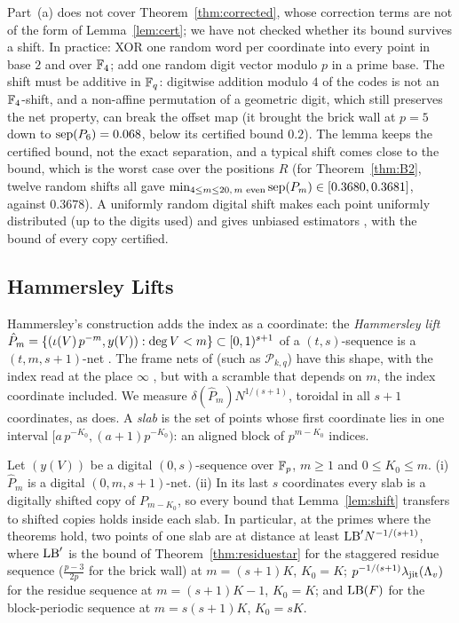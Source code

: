 Part~(a) does not cover Theorem~\ref{thm:corrected}, whose correction terms are not of the form of Lemma~\ref{lem:cert}; we have not checked whether its bound survives a shift. In practice: XOR one random word per coordinate into every point in base $2$ and over $\mathbb{F}_4$; add one random digit vector modulo $p$ in a prime base. The shift must be additive in $\mathbb{F}_q$: digitwise addition modulo $4$ of the codes is not an $\mathbb{F}_4$-shift, and a non-affine permutation of a geometric digit, which still preserves the net property, can break the offset map (it brought the brick wall at $p=5$ down to $\operatorname{sep}(P_6)=0.068$, below its certified bound $0.2$). The lemma keeps the certified bound, not the exact separation, and a typical shift comes close to the bound, which is the worst case over the positions $R$ (for Theorem~\ref{thm:B2}, twelve random shifts all gave $\min_{4\le m\le20,\,m\text{ even}}\operatorname{sep}(P_m)\in[0.3680,0.3681]$, against $0.3678$). A uniformly random digital shift makes each point uniformly distributed (up to the digits used) and gives unbiased estimators \cite{DP10}, with the bound of every copy certified.

%
%
%
%
%
%
%
%
%
%
%
\subsection{Hammersley Lifts}\label{sec:hammersley}
Hammersley's construction adds the index as a coordinate: the \emph{Hammersley lift} $\hat P_m=\{(\iota(V)\,p^{-m},y(V)):\deg V<m\}\subset[0,1)^{s+1}$ of a $(t,s)$-sequence is a $(t,m,s+1)$-net \cite[Lemma~4.22]{Nie92}. The frame nets of \cite{Gru26geo} (such as $\mathcal P_{k,q}$) have this shape, with the index read at the place $\infty$%
, but with a scramble that depends on $m$, the index coordinate included. We measure $\delta(\hat P_m)N^{1/(s+1)}$, toroidal in all $s+1$ coordinates, as \cite{Gru26geo} does. A \emph{slab} is the set of points whose first coordinate lies in one interval $[a\,p^{-K_0},(a+1)p^{-K_0})$: an aligned block of $p^{m-K_0}$ indices.

\begin{proposition}\label{prop:liftslab}
Let $(y(V))$ be a digital $(0,s)$-sequence over $\mathbb{F}_p$, $m\ge1$ and $0\le K_0\le m$. (i) $\hat P_m$ is a digital $(0,m,s+1)$-net. (ii) In its last $s$ coordinates every slab is a digitally shifted copy of $P_{m-K_0}$, so every bound that Lemma~\ref{lem:shift} transfers to shifted copies holds inside each slab. In particular, at the primes where the theorems hold, two points of one slab are at distance at least $\mathrm{LB}'N^{-1/(s+1)}$, where $\mathrm{LB}'$ is the bound of Theorem~\ref{thm:residuestar} for the staggered residue sequence ($\frac{p-3}{2p}$ for the brick wall) at $m=(s+1)K$, $K_0=K$; $p^{-1/(s+1)}\lambda_{\mathrm{jit}}(\Lambda_v)$ for the residue sequence at $m=(s+1)K-1$, $K_0=K$; and $\mathrm{LB}(F)$ for the block-periodic sequence at $m=s(s+1)K$, $K_0=sK$.
\end{proposition}


